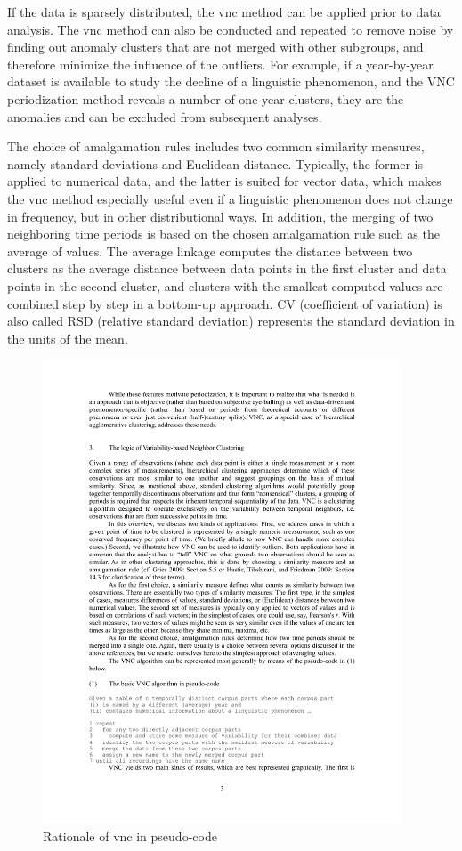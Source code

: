 If the data is sparsely distributed, the \gls{vnc} method can be applied prior to data analysis. The \gls{vnc} method can also be conducted and repeated to remove noise by finding out anomaly clusters that are not merged with other subgroups, and therefore minimize the influence of the outliers. For example, if a year-by-year dataset is available to study the decline of a linguistic phenomenon, and the VNC periodization method reveals a number of one-year clusters, they are the anomalies and can be excluded from subsequent analyses.

The choice of amalgamation rules includes two common similarity measures, namely standard deviations and Euclidean distance. Typically, the former is applied to numerical data, and the latter is suited for vector data, which makes the \gls{vnc} method especially useful even if a linguistic phenomenon does not change in frequency, but in other distributional ways. In addition, the merging of two neighboring time periods is based on the chosen amalgamation rule such as the average of values. The average linkage computes the distance between two clusters as the average distance between data points in the first cluster and data points in the second cluster, and clusters with the smallest computed values are combined step by step in a bottom-up approach. CV (coefficient of variation) is also called RSD (relative standard deviation) represents the standard deviation in the units of the mean.

\begin{figure}[H]
  \centering
  \includegraphics[width=0.95\textwidth,keepaspectratio]{figures_ref/Gries_and_Hilpert_2012_VNC_algo.pdf}
  \caption{Rationale of \gls{vnc} in pseudo-code \parencite{gries2012variability}}
\end{figure}

